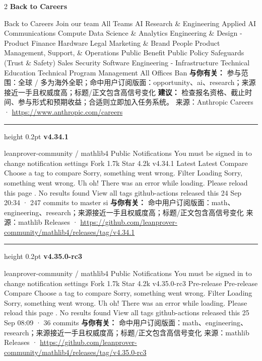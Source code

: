 \documentclass[10.5pt]{ctexart}
\begin{document}
\begin{multicols}{2}
{\large\bfseries Back to Careers}\par
Back to Careers Join our team All Teams AI Research \& Engineering Applied AI Communications Compute Data Science \& Analytics Engineering \& Design - Product Finance Hardware Legal Marketing \& Brand People Product Management, Support, \& Operations Public Benefit Public Policy Safeguards (Trust \& Safety) Sales Security Software Engineering - Infrastructure Technical Education Technical Program Management All Offices Ban
\textbf{与你有关：} 参与范围：全球 / 多为海外全职；命中用户订阅版面：opportunity、ai、research；来源接近一手且权威度高；标题/正文包含高信号变化
\textbf{建议：} 检查报名资格、截止时间、参与形式和预期收益；合适则立即加入任务系统。
{\footnotesize\color{ormuted} 来源：Anthropic Careers · \url{https://www.anthropic.com/careers}}
\vspace{2mm}
\hrule height 0.2pt
\vspace{2mm}
{\large\bfseries v4.34.1}\par
leanprover-community / mathlib4 Public Notifications You must be signed in to change notification settings Fork 1.7k Star 4.2k v4.34.1 Latest Latest Compare Choose a tag to compare Sorry, something went wrong. Filter Loading Sorry, something went wrong. Uh oh! There was an error while loading. Please reload this page . No results found View all tags github-actions released this 24 Sep 20:34 · 247 commits to master si
\textbf{与你有关：} 命中用户订阅版面：math、engineering、research；来源接近一手且权威度高；标题/正文包含高信号变化
{\footnotesize\color{ormuted} 来源：mathlib Releases · \url{https://github.com/leanprover-community/mathlib4/releases/tag/v4.34.1}}
\vspace{2mm}
\hrule height 0.2pt
\vspace{2mm}
{\large\bfseries v4.35.0-rc3}\par
leanprover-community / mathlib4 Public Notifications You must be signed in to change notification settings Fork 1.7k Star 4.2k v4.35.0-rc3 Pre-release Pre-release Compare Choose a tag to compare Sorry, something went wrong. Filter Loading Sorry, something went wrong. Uh oh! There was an error while loading. Please reload this page . No results found View all tags github-actions released this 25 Sep 08:09 · 36 commits
\textbf{与你有关：} 命中用户订阅版面：math、engineering、research；来源接近一手且权威度高；标题/正文包含高信号变化
{\footnotesize\color{ormuted} 来源：mathlib Releases · \url{https://github.com/leanprover-community/mathlib4/releases/tag/v4.35.0-rc3}}

\end{multicols}
\end{document}
